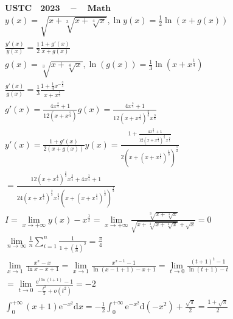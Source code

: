 \documentclass{article}
\begin{document}
\begin{align*}
    \bm{USTC \quad 2023 \quad - \quad Math} \\
    y(x) = \sqrt{x+\sqrt[3]{x+\sqrt[4]{x}}} ,\ln y(x) = \frac{1}{2}\ln\left(x+g(x)\right)\\
    \frac{y'(x)}{y(x)} = \frac{1}{2}\frac{1+g'(x)}{x+g(x)} \\
    g(x) = \sqrt[3]{x+\sqrt[4]{x}},\ln\left(g(x)\right) = \frac{1}{3}\ln\left(x+x^{\frac{1}{4}}\right)\\
    \frac{g'(x)}{g(x)} = \frac{1}{3} \frac{1+\frac{1}{4}x^{-\frac{3}{4}}}{x+x^{\frac{1}{4}}} \\
    g'(x) = \frac{4x^{\frac{3}{4}}+1}{12(x+x^{\frac{7}{4}})}g(x)=\frac{4x^{\frac{3}{4}}+1}{12(x+x^{\frac{1}{4}})^{\frac{2}{3}}x^{\frac{3}{4}}} \\
    y'(x) = \frac{1+g'(x)}{2(x+g(x))}y(x) = \frac{1+\frac{4x^{\frac{3}{4}}+1}{12(x+x^{\frac{1}{4}})^{\frac{2}{3}}x^{\frac{3}{4}}}}{2(x+(x+x^{\frac{1}{4}})^{\frac{1}{3}})^{\frac{1}{2}}} \\ 
    = \frac{12(x+x^{\frac{1}{4}})^{\frac{2}{3}}x^{\frac{3}{4}}+4x^{\frac{3}{4}}+1}{24(x+x^{\frac{1}{4}})^{\frac{2}{3}}x^{\frac{3}{4}}(x+(x+x^{\frac{1}{4}})^{\frac{1}{3}})^{\frac{1}{2}}} \\ 
    I = \lim_{x \to +\infty} y(x)-x^{\frac{1}{2}} = \lim_{x \to +\infty} \frac{\sqrt[3]{x+\sqrt[4]{x}}}{\sqrt{x+\sqrt[3]{x+\sqrt[4]{x}}}+\sqrt{x}} = 0 \\ 
    \lim_{n \to \infty}  \frac{1}{n} \sum_{i=1}^{n} \frac{1}{1+\left(\frac{i}{n}\right)^2} = \frac{\pi}{4}  \\
    \lim_{x \to 1} \frac{x^{x}-x}{\ln x-x +1} = \lim_{ x \to 1} \frac{x^{x-1}-1}{\ln(x-1 + 1)-x+1} = \lim_{t \to 0}\frac{(t+1)^{t}-1}{\ln (t+1)-t} \\ 
    = \lim_{t \to 0}\frac{\mathrm{e}^{t\ln(t+1)}-1}{-\frac{t^2}{2}+o(t^2)} = -2\\ 
    \int_{0}^{+\infty} (x+1)\mathrm{e}^{-x^2}\mathrm{d}x = -\frac{1}{2}\int_{0}^{+\infty} \mathrm{e}^{-x^2}\mathrm{d}(-x^2) + \frac{\sqrt{\pi}}{2} = \frac{1+\sqrt{\pi}}{2}
\end{align*}

\clearpage 
\end{document}
